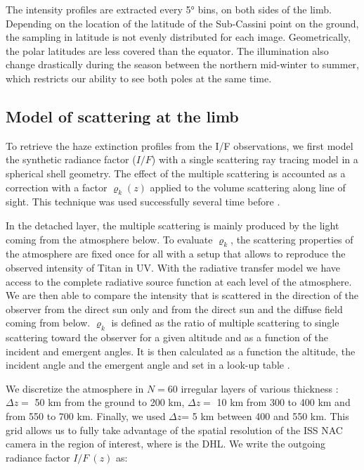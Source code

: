 The intensity profiles are extracted every \ang{5} bins, on both sides of the limb. Depending on the location of the
latitude of the Sub-Cassini point on the ground, the sampling in latitude is not evenly distributed for each image.
Geometrically, the polar latitudes are less covered than the equator. The illumination also change drastically during the
season between the northern mid-winter to summer, which restricts our ability to see both poles at the same time.



\subsection{Model of scattering at the limb}

To retrieve the haze extinction profiles from the I/F observations, we first model the synthetic radiance factor ($I/F$)
with a single scattering ray tracing model in a spherical shell geometry. The effect of the multiple scattering is
accounted as a correction with a factor $\varrho_k\left(z\right)$ applied to the volume scattering along line of sight.
This technique was used successfully several time before \citep[e.g.][]{Rages1983, Rannou1997, Seignovert2017, West2018}.

In the detached layer, the multiple scattering is mainly produced by the light coming from the atmosphere below. To
evaluate $\varrho_k$, the scattering properties of the atmosphere are fixed once for all with a setup that allows to
reproduce the observed intensity of Titan in UV. With the radiative transfer model \citep[the SHDOMPP from][]{Evans1998}
we have access to the complete radiative source function at each level of the atmosphere. We are then able to compare the
intensity that is scattered in the direction of the observer from the direct sun only and from the direct sun and the diffuse
field coming from below. $\varrho_k$ is defined as the ratio of multiple scattering to single scattering toward the observer
for a given altitude and as a function of the incident and emergent angles. It is then calculated as a function the
altitude, the incident angle and the emergent angle and set in a look-up table \citep{West2018}.

We discretize the atmosphere in $N=60$ irregular layers of various thickness : $\Delta z =$ 50 km from the
ground to 200 km, $\Delta z =$ 10 km from 300 to 400 km and from 550 to 700 km. Finally, we used
$\Delta z$= 5 km between 400 and 550 km. This grid allows us to fully take advantage of the spatial resolution
of the ISS NAC camera in the region of interest, where is the DHL. We write the outgoing radiance factor $I/F\ (z)$ as:

